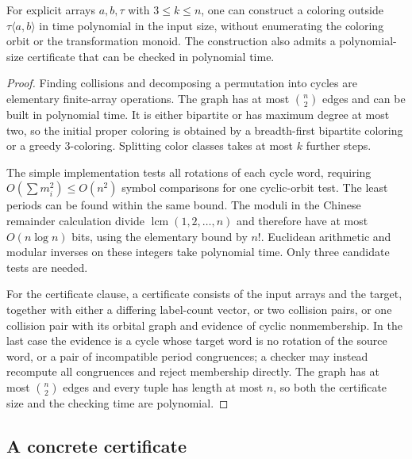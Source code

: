 \documentclass[11pt,a4paper]{article}
\numberwithin{equation}{section}
\theoremstyle{definition}
\theoremstyle{remark}
\newcommand{\lcm}{\operatorname{lcm}}
\begin{document}
\begin{proposition}\label{prop:algorithm}
For explicit arrays $a,b,\tau$ with $3\le k\le n$, one can construct a
coloring outside $\tau\langle a,b\rangle$ in time polynomial in the input
size, without enumerating the coloring orbit or the transformation monoid.
The construction also admits a polynomial-size certificate that can be
checked in polynomial time.
\end{proposition}
\begin{proof}
Finding collisions and decomposing a permutation into cycles are elementary
finite-array operations. The graph has at most $\binom n2$ edges and can be
built in polynomial time. It is either bipartite or has maximum degree at
most two, so the initial proper coloring is obtained by a breadth-first
bipartite coloring or a greedy $3$-coloring. Splitting color classes takes at
most $k$ further steps.

The simple implementation tests all rotations of each cycle word, requiring
$O(\sum m_i^2)\le O(n^2)$ symbol comparisons for one cyclic-orbit test.
The least periods can be found within the same bound. The moduli in the
Chinese remainder calculation divide $\lcm(1,2,\ldots,n)$ and therefore
have at most $O(n\log n)$ bits, using the elementary bound by $n!$.
Euclidean arithmetic and modular inverses on these integers take polynomial
time. Only three candidate tests are needed.

For the certificate clause, a certificate consists of the input arrays and
the target, together with either a differing label-count vector, or two
collision pairs, or one collision pair with its orbital graph and evidence of
cyclic nonmembership. In the last case the evidence is a cycle whose target
word is no rotation of the source word, or a pair of incompatible period
congruences; a checker may instead recompute all congruences and reject
membership directly. The graph has at most $\binom n2$ edges and every tuple
has length at most $n$, so both the certificate size and the checking time
are polynomial.
\end{proof}

\subsection{A concrete certificate}
\end{document}
